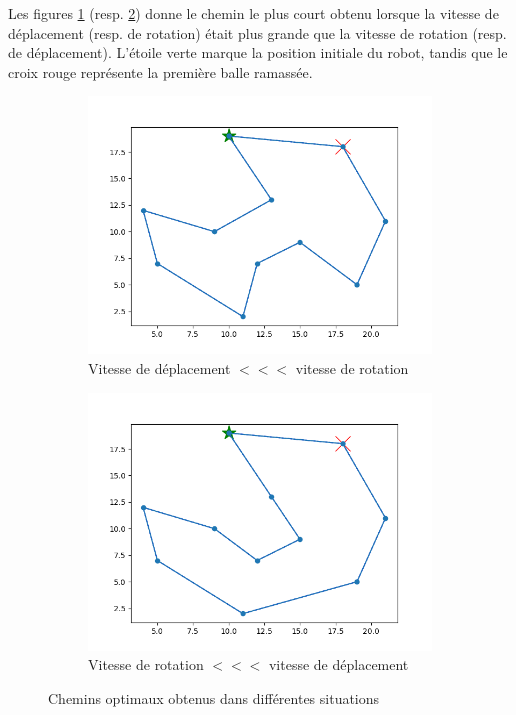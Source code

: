 \documentclass[12pt]{article}
\begin{document}
    Les figures \ref{subfig:terrain3mvt} (resp. \ref{subfig:terrain3rot}) donne le chemin le plus court obtenu lorsque la vitesse de déplacement (resp. de rotation) était plus grande que la vitesse de rotation (resp. de déplacement). L'étoile verte marque la position initiale du robot, tandis que le croix rouge représente la première balle ramassée.

    \begin{figure}[H]
        \centering
        \begin{subfigure}{0.35\textwidth}
          \centering
          \includegraphics[width=\linewidth]{img/terrain3mvt}
          \caption{Vitesse de déplacement $<<<$ vitesse de rotation}
          \label{subfig:terrain3mvt}
        \end{subfigure}
        \hfill
        \begin{subfigure}{0.35\textwidth}
          \centering
          \includegraphics[width=\linewidth]{img/terrain3rot}
          \caption{Vitesse de rotation $<<<$ vitesse de déplacement}
          \label{subfig:terrain3rot}
        \end{subfigure}
        \caption{Chemins optimaux obtenus dans différentes situations}
        \label{fig:terrain3}
    \end{figure}
\end{document}
